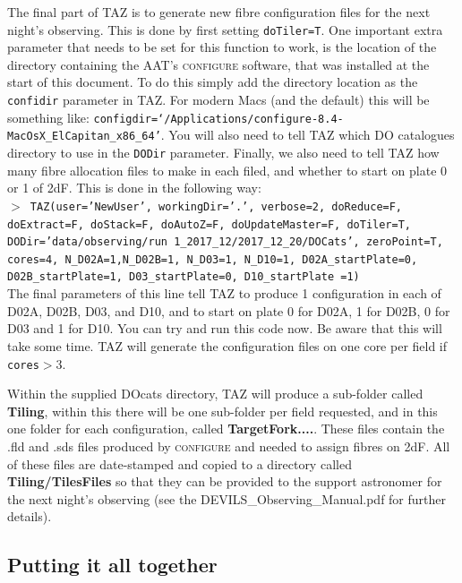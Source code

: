 \documentclass[12pt]{article}
\begin{document}
 The final part of TAZ is to generate new fibre configuration files for the next night's observing. This is done by first setting \texttt{doTiler=T}. One important extra parameter that needs to be set for this function to work, is the location of the directory containing the AAT's \textsc{configure} software, that was installed at the start of this document. To do this simply add the directory location as the \texttt{confidir} parameter in TAZ. For modern Macs (and the default) this will be something like: \texttt{configdir=`/Applications/configure-8.4-MacOsX\_ElCapitan\_x86\_64'}. You will also need to tell TAZ which DO catalogues directory to use in the \texttt{DODir} parameter. Finally, we also need to tell TAZ how many fibre allocation files to make in each filed, and whether to start on plate 0 or 1 of 2dF. This is done in the following way: \\
 
  \hspace{10mm} \texttt{$>$ TAZ(user='NewUser', workingDir='.', verbose=2, doReduce=F, doExtract=F, doStack=F, doAutoZ=F, doUpdateMaster=F, doTiler=T, DODir='data/observing/run 1\_2017\_12/2017\_12\_20/DOCats', zeroPoint=T,  cores=4,  N\_D02A=1,N\_D02B=1, N\_D03=1, N\_D10=1, D02A\_startPlate=0, D02B\_startPlate=1, D03\_startPlate=0, D10\_startPlate =1)}\\  
 
 The final parameters of this line tell TAZ to produce 1 configuration in each of D02A, D02B, D03, and D10, and to start on plate 0 for D02A, 1 for D02B, 0 for D03 and 1 for D10. You can try and run this code now. Be aware that this will take some time. TAZ will generate the configuration files on one core per field if \texttt{cores}$>$3. 
 
 Within the supplied DOcats directory, TAZ will produce a sub-folder called \textbf{Tiling}, within this there will be one sub-folder per field requested, and in this one folder for each configuration, called \textbf{TargetFork....}. These files contain the .fld and .sds files produced by \textsc{configure} and needed to assign fibres on 2dF. All of these files are date-stamped and copied to a directory called  \textbf{Tiling/TilesFiles}  so that they can be provided to the support astronomer for the next night's observing (see the DEVILS\_Observing\_Manual.pdf for further details). 
 
 
 \subsection{Putting it all together}
 
\end{document}
